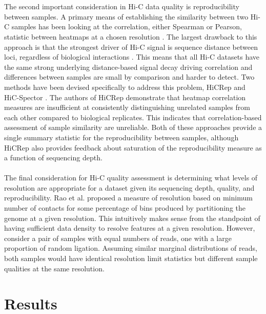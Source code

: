 \\\\
The second important consideration in Hi-C data quality is reproducibility between samples. A primary means of establishing the similarity between two Hi-C samples has been looking at the correlation, either Spearman or Pearson, statistic between heatmaps at a chosen resolution \cite{hou_gene_2012,battulin_comparison_2015,crane_condensin-driven_2015,li_widespread_2015,nagano_comparison_2015,rao_3d_2014}. The largest drawback to this approach is that the strongest driver of Hi-C signal is sequence distance between loci, regardless of biological interactions \cite{lieberman-aiden_comprehensive_2009}. This means that all Hi-C datasets have the same strong underlying distance-based signal decay driving correlation and differences between samples are small by comparison and harder to detect. Two methods have been devised specifically to address this problem, HiCRep \cite{yang_hicrep:_2017} and HiC-Spector \cite{yan_hic-spector:_2017}. The authors of HiCRep demonstrate that heatmap correlation measures are insufficient at consistently distinguishing unrelated samples from each other compared to biological replicates. This indicates that correlation-based assessment of sample similarity are unreliable. Both of these approaches provide a single summary statistic for the reproducibility between samples, although HiCRep also provides feedback about saturation of the reproducibility measure as a function of sequencing depth.
\\\\
The final consideration for Hi-C quality assessment is determining what levels of resolution are appropriate for a dataset given its sequencing depth, quality, and reproducibility. Rao et al. \cite{rao_3d_2014} proposed a measure of resolution based on minimum number of contacts for some percentage of bins produced by partitioning the genome at a given resolution. This intuitively makes sense from the standpoint of having sufficient data density to resolve features at a given resolution. However, consider a pair of samples with equal numbers of reads, one with a large proportion of random ligation. Assuming similar marginal distributions of reads, both samples would have identical resolution limit statistics but different sample qualities at the same resolution. 

\section{Results}

